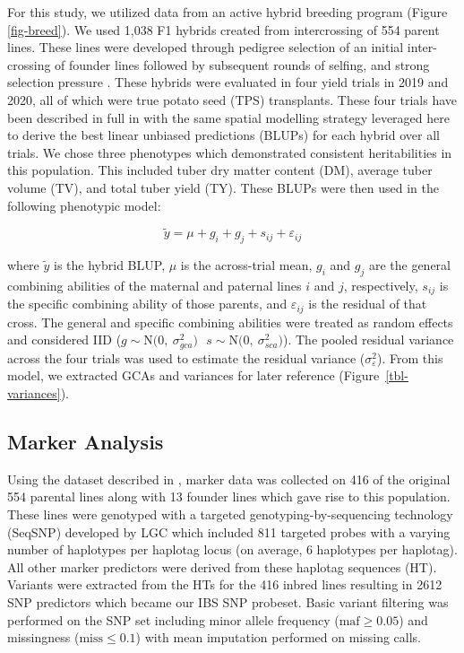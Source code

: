 \begin{refsection}
For this study, we utilized data from an active hybrid breeding program
(Figure \ref{fig-breed}). We used 1,038 F1 hybrids created from
intercrossing of 554 parent lines. These lines were developed through
pedigree selection of an initial inter-crossing of founder lines
followed by subsequent rounds of selfing, and strong selection pressure
\parencite{Lindhout2011}. These hybrids were evaluated in four yield
trials in 2019 and 2020, all of which were true potato seed (TPS)
transplants. These four trials have been described in full in
\parencite{Adams2023} with the same spatial modelling strategy leveraged
here to derive the best linear unbiased predictions
(BLUPs) for each hybrid over all trials. We chose three phenotypes which
demonstrated consistent heritabilities in this population. This included
tuber dry matter content (DM), average tuber volume (TV), and total
tuber yield (TY). These BLUPs were then used in the following phenotypic
model:

\[\tilde{y} = \mu + g_i + g_j + s_{ij} + \varepsilon_{ij}\]

where \(\tilde{y}\) is the hybrid BLUP, \(\mu\) is the across-trial
mean, \(g_i\) and \(g_j\) are the general combining abilities of the
maternal and paternal lines \(i\) and \(j\), respectively, \(s_{ij}\) is
the specific combining ability of those parents, and
\(\varepsilon_{ij}\) is the residual of that cross. The general and
specific combining abilities were treated as random effects and
considered IID
(\(g \sim \mathrm{N(0,~}\sigma^2_{gca})~~~s \sim \mathrm{N(0,~}\sigma^2_{sca})\)).
The pooled residual variance across the four trials was used to estimate the residual variance (\(\sigma^2_{\varepsilon}\)). From this model, we
extracted GCAs and variances for later reference
(Figure~\ref{tbl-variances}).



\subsection{Marker Analysis}\label{marker-analysis}

Using the dataset described in \parencite{Adams2023}, marker data was
collected on 416 of the original 554 parental lines along with 13
founder lines which gave rise to this population. These lines were
genotyped with a targeted genotyping-by-sequencing technology (SeqSNP)
developed by LGC \parencite{LGC2019} which included 811 targeted probes
with a varying number of haplotypes per haplotag locus (on average, 6 haplotypes per
haplotag). All other marker predictors were derived from these haplotag sequences (HT). Variants were extracted from the HTs for the 416 inbred
lines resulting in 2612 SNP predictors which became our IBS SNP probeset. Basic variant filtering was performed
on the SNP set including minor allele frequency
(\(\text{maf} \ge 0.05\)) and missingness (\(\text{miss} \le 0.1\)) with
mean imputation performed on missing calls.


\end{refsection}
